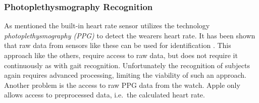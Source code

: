\subsubsection{Photoplethysmography Recognition}
As mentioned the built-in heart rate sensor utilizes the technology
\textit{photoplethysmography (PPG)} to detect the wearers heart rate. It has
been shown that raw data from sensors like these can be used for identification
\cite{kavsaoglu2013a}. This approach like the others, require access to raw
data, but does not require it continuously as with gait recognition.
Unfortunately the recognition of subjects again requires advanced processing,
limiting the viability of such an approach. Another problem is the access to raw
PPG data from the watch. Apple only allows access to preprocessed data, i.e.\
the calculated heart rate. 
